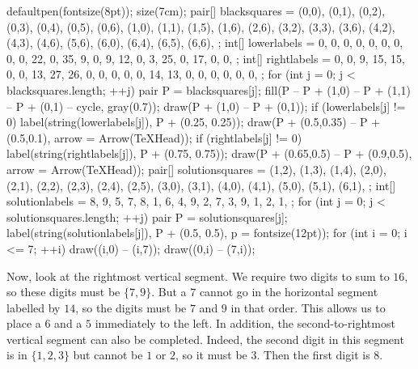 	\begin{center}
		\begin{asy}
			defaultpen(fontsize(8pt));
			size(7cm);
			pair[] blacksquares = {
				(0,0), (0,1), (0,2), (0,3), (0,4), (0,5), (0,6),
				(1,0), (1,1), (1,5), (1,6),
				(2,6),
				(3,2), (3,3), (3,6),
				(4,2), (4,3), (4,6),
				(5,6),
				(6,0), (6,4), (6,5), (6,6),
			};
			int[] lowerlabels = {
				0, 0, 0, 0, 0, 0, 0,
				0, 0, 22, 0,
				35,
				9, 0, 9,
				12, 0, 3,
				25,
				0, 17, 0, 0,
			};
			int[] rightlabels = {
				0, 0, 9, 15, 15, 0, 0,
				13, 27, 26, 0,
				0,
				0, 0, 0,
				14, 13, 0,
				0,
				0, 0, 0, 0,
			};
			for (int j = 0; j < blacksquares.length; ++j) {
				pair P = blacksquares[j];
				fill(P -- P + (1,0) -- P + (1,1) -- P + (0,1) -- cycle, gray(0.7));
				draw(P + (1,0) -- P + (0,1));
				if (lowerlabels[j] != 0) {
					label(string(lowerlabels[j]), P + (0.25, 0.25));
					draw(P + (0.5,0.35) -- P + (0.5,0.1), arrow = Arrow(TeXHead));
				}
				if (rightlabels[j] != 0) {
					label(string(rightlabels[j]), P + (0.75, 0.75));
					draw(P + (0.65,0.5) -- P + (0.9,0.5), arrow = Arrow(TeXHead));
				}
			}
			pair[] solutionsquares = {
				(1,2), (1,3), (1,4),
				(2,0), (2,1), (2,2), (2,3), (2,4), (2,5),
				(3,0), (3,1),
				(4,0), (4,1),
				(5,0), (5,1),
				(6,1),
			};
			int[] solutionlabels = {
				8, 9, 5,
				7, 8, 1, 6, 4, 9,
				2, 7,
				3, 9,
				1, 2,
				1,
			};
			for (int j = 0; j < solutionsquares.length; ++j) {
				pair P = solutionsquares[j];
				label(string(solutionlabels[j]), P + (0.5, 0.5), p = fontsize(12pt));
			}
			for (int i = 0; i <= 7; ++i) {
				draw((i,0) -- (i,7));
				draw((0,i) -- (7,i));
			}
		\end{asy}
	\end{center}
	Now, look at the rightmost vertical segment. We require two digits to sum to $16$, so these digits must be $\{7,9\}$. But a $7$ cannot go in the horizontal segment labelled by $14$, so the digits must be $7$ and $9$ in that order. This allows us to place a $6$ and a $5$ immediately to the left. In addition, the second-to-rightmost vertical segment can also be completed. Indeed, the second digit in this segment is in $\{1,2,3\}$ but cannot be $1$ or $2$, so it must be $3$. Then the first digit is $8$.
